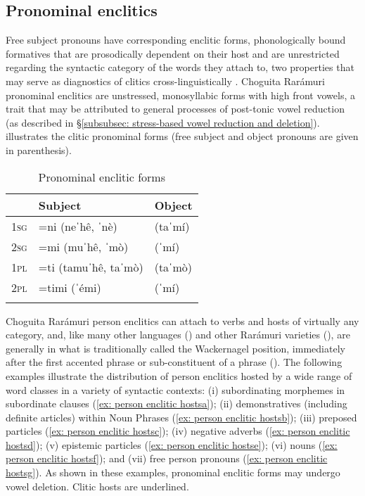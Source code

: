 \subsection{Pronominal enclitics}
\label{subsec: pronominal enclitics}

Free subject pronouns have corresponding enclitic forms, phonologically bound formatives that are prosodically dependent on their host and are unrestricted regarding the syntactic category of the words they attach to, two properties that may serve as diagnostics of clitics cross-linguistically \parencite{bickel2007inflectional}. Choguita Rarámuri pronominal enclitics are unstressed, monosyllabic forms with high front vowels, a trait that may be attributed to general processes of post-tonic vowel reduction (as described in §\ref{subsubsec: stress-based vowel reduction and deletion}).  illustrates the clitic pronominal forms (free subject and object pronouns are given in parenthesis).

\begin{table}
\caption{Pronominal enclitic forms}
\label{tab:key:22}

\begin{tabularx}{.5\textwidth}{lll}
\lsptoprule
& \textbf{Subject} & \textbf{Object}\\
\midrule
 \textsc{1sg} & =ni (neˈhê, ˈnè) & (taˈmí)\\
 \textsc{2sg} & =mi (muˈhê, ˈmò) & (ˈmí)\\
 \textsc{1pl} & =ti (tamuˈhê, taˈmò) & (taˈmò)\\
 \textsc{2pl} & =timi (ˈémi) & (ˈmí)\\
\lspbottomrule
\end{tabularx}
\end{table}



Choguita Rarámuri person enclitics can attach to verbs and hosts of virtually any category, and, like many other  languages (\citealt{steele1976law}) and other Rarámuri varieties (\citealt{moralesmoreno2016rochecahi}), are generally in what is traditionally called the Wackernagel position, immediately after the first accented phrase or sub-constituent of a phrase (\citealt{bickel2007inflectional}). The following examples illustrate the distribution of person enclitics hosted by a wide range of word classes in a variety of syntactic contexts: (i) subordinating morphemes in subordinate clauses (\ref{ex: person enclitic hostsa}); (ii) demonstratives (including definite articles) within Noun Phrases (\ref{ex: person enclitic hostsb}); (iii) preposed particles (\ref{ex: person enclitic hostsc}); (iv) negative adverbs (\ref{ex: person enclitic hostsd}); (v) epistemic particles (\ref{ex: person enclitic hostse}); (vi) nouns (\ref{ex: person enclitic hostsf}); and (vii) free person pronouns (\ref{ex: person enclitic hostsg}). As shown in these examples, pronominal enclitic forms may undergo vowel deletion. Clitic hosts are underlined.

